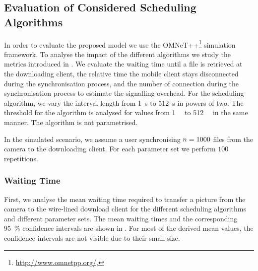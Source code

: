 \subsection{Evaluation of Considered Scheduling Algorithms}\label{sec:application:cloud_file_synchronisation:numerical_evaluation}
In order to evaluate the proposed model we use the OMNeT++\footnote{\url{http://www.omnetpp.org/}, \accessed} simulation framework.
To analyse the impact of the different algorithms we study the metrics introduced in .
We evaluate the waiting time \sojournTime until a file is retrieved at the downloading client, the relative time the mobile client stays disconnected \relativeDisconnectedTime during the synchronisation process, and the number of connection \connectionCount during the synchronisation process to estimate the signalling overhead.
For the \algointerval scheduling algorithm, we vary the interval length \thresholdInterval from \SI{1}{\second} to \SI{512}{\second} in powers of two.
The threshold \thresholdSize for the \algosize algorithm is analysed for values from \SI{1}{\mega\byte} to \SI{512}{\mega\byte} in the same manner.
The \algoimmediate algorithm is not parametrised.

In the simulated scenario, we assume a user synchronising \(n = 1000\) files from the camera to the downloading client.
For each parameter set we perform \(100\) repetitions.

\subsubsection*{Waiting Time}\label{sec:application:cloud_file_synchronisation:numerical_evaluation:waiting_time}
First, we analyse the mean waiting time \sojournTime required to transfer a picture from the camera to the wire-lined download client for the different scheduling algorithms and different parameter sets.
The mean waiting times \sojournTime and the corresponding \SI{95}{\percent} confidence intervals are shown in .
For most of the derived mean values, the confidence intervals are not visible due to their small size.

